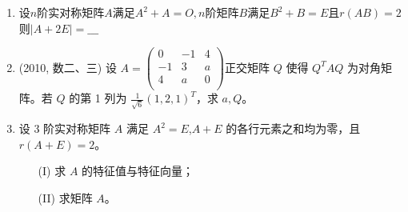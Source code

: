\documentclass[12pt, a4paper, oneside, UTF8]{ctexbook}
\begin{document}
\begin{enumerate}[label=\arabic*.,start=12]
    \item 设$n$阶实对称矩阵$A$满足$A^2+A=O,n$阶矩阵$B$满足$B^2+B=E$且$r(AB)=2$则$\left|A+2E\right|=\_\_\_$
    
    \begin{solution}
        \newpage
    \end{solution}

    \item (2010, 数二、三) 设
    $
    A = \begin{pmatrix}
    0 & -1 & 4 \\
    -1 & 3 & a  \\
    4 & a & 0  \\
    \end{pmatrix}
    $正交矩阵 $Q$ 使得 $Q^T A Q$ 为对角矩阵。若 $Q$ 的第 1 列为 
    $\frac{1}{\sqrt{6}}(1,2,1)^T$，求 $a, Q$。
    
    \begin{solution}
    \newpage
    \end{solution}
    
    \item 设 3 阶实对称矩阵 $A$ 满足 $A^2 = E$,$A+E$ 的各行元素之和均为零，且 $r(A+E) = 2$。
    \begin{enumerate}
        \item [(I)] 求 $A$ 的特征值与特征向量；
        \item [(II)] 求矩阵 $A$。
    \end{enumerate}
    
    \begin{solution}
    \newpage
    \end{solution}
\end{enumerate}

\ifx\allfiles\undefined
\end{document}
